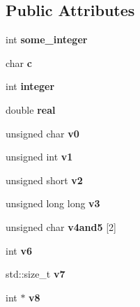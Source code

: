 \subsection*{Public Attributes}
\begin{DoxyCompactItemize}
\item 
\mbox{\label{classfoo_a45cbc4a51650282ea158276d03c954da}} 
int {\bfseries some\+\_\+integer}
\item 
\mbox{\label{classfoo_a87fe6d5cdcf00a8376eb6d2cc3fff63e}} 
char {\bfseries c}
\item 
\mbox{\label{classfoo_ad526cfd4e4684dfb1195ca8fb73aab4a}} 
int {\bfseries integer}
\item 
\mbox{\label{classfoo_ad57eb66ef88b8d6c298bff958f9751f6}} 
double {\bfseries real}
\item 
\mbox{\label{classfoo_a7986ed8a2ebdd62127803c8089ee54ff}} 
unsigned char {\bfseries v0}
\item 
\mbox{\label{classfoo_a02a454d27b6a760d4f651aa756b85835}} 
unsigned int {\bfseries v1}
\item 
\mbox{\label{classfoo_a26bf62c95ea236ecf2730647527d4d51}} 
unsigned short {\bfseries v2}
\item 
\mbox{\label{classfoo_a7f71fb2ec87b027ec99a9acfab33e4f9}} 
unsigned long long {\bfseries v3}
\item 
\mbox{\label{classfoo_aed8f03db9469205f9d0af3b4c91c8d77}} 
unsigned char {\bfseries v4and5} \mbox{[}2\mbox{]}
\item 
\mbox{\label{classfoo_a59da6aecac3a7fb4892d66d6ccfc8a9c}} 
int {\bfseries v6}
\item 
\mbox{\label{classfoo_a47eca2f8022d66d8952219f8a8966bb1}} 
std\+::size\+\_\+t {\bfseries v7}
\item 
\mbox{\label{classfoo_ac645989cfe3b0595467e88efa20e2c51}} 
int $\ast$ {\bfseries v8}
\item 

\end{DoxyCompactItemize}
